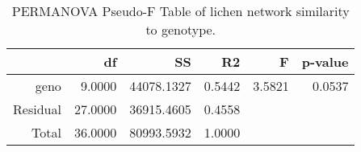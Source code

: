 \begin{table}[ht]
\centering
\begin{tabular}{rrrrrr}
  \hline
 & df & SS & R2 & F & p-value \\ 
  \hline
geno & 9.0000 & 44078.1327 & 0.5442 & 3.5821 & 0.0537 \\ 
  Residual & 27.0000 & 36915.4605 & 0.4558 &  &  \\ 
  Total & 36.0000 & 80993.5932 & 1.0000 &  &  \\ 
   \hline
\end{tabular}
\caption{PERMANOVA Pseudo-F Table of lichen network similarity to genotype.} 
\label{tab:cn_perm}
\end{table}
